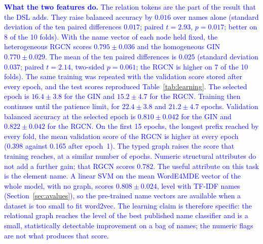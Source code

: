 \documentclass[journal,article,submit,moreauthors,technologies]{Definitions/mdpi}
\newcommand{\rev}[1]{\textcolor{blue}{#1}}
\begin{document}
\rev{\textbf{What the two features do.} The relation tokens are the part of the result that the DSL adds. They raise balanced accuracy by $0.016$ over names alone (standard deviation of the ten paired differences $0.017$; paired $t=2.93$, $p=0.017$; better on 8 of the 10 folds). With the name vector of each node held fixed, the heterogeneous RGCN scores $0.795\pm0.036$ and the homogeneous GIN $0.770\pm0.029$. The mean of the ten paired differences is $0.025$ (standard deviation $0.037$; paired $t=2.14$, two-sided $p=0.061$; the RGCN is higher on 7 of the 10 folds). The same training was repeated with the validation score stored after every epoch, and the test scores reproduced Table~\ref{tab:learning}. The selected epoch is $16.4\pm3.8$ for the GIN and $15.2\pm4.7$ for the RGCN. Training then continues until the patience limit, for $22.4\pm3.8$ and $21.2\pm4.7$ epochs. Validation balanced accuracy at the selected epoch is $0.810\pm0.042$ for the GIN and $0.822\pm0.042$ for the RGCN. On the first 15 epochs, the longest prefix reached by every fold, the mean validation score of the RGCN is higher at every epoch (0.398 against 0.165 after epoch~1). The typed graph raises the score that training reaches, at a similar number of epochs. Numeric structural attributes do not add a further gain; that RGCN scores $0.782$. The useful attribute on this task is the element name. A linear SVM on the mean WordE4MDE vector of the whole model, with no graph, scores \(0.808\pm0.024\), level with TF-IDF names (Section~\ref{sec:avalues}), so the pre-trained name vectors are available when a dataset is too small to fit word2vec. The learning claim is therefore specific: the relational graph reaches the level of the best published name classifier and is a small, statistically detectable improvement on a bag of names; the numeric flags are not what produces that score.}
\end{document}
